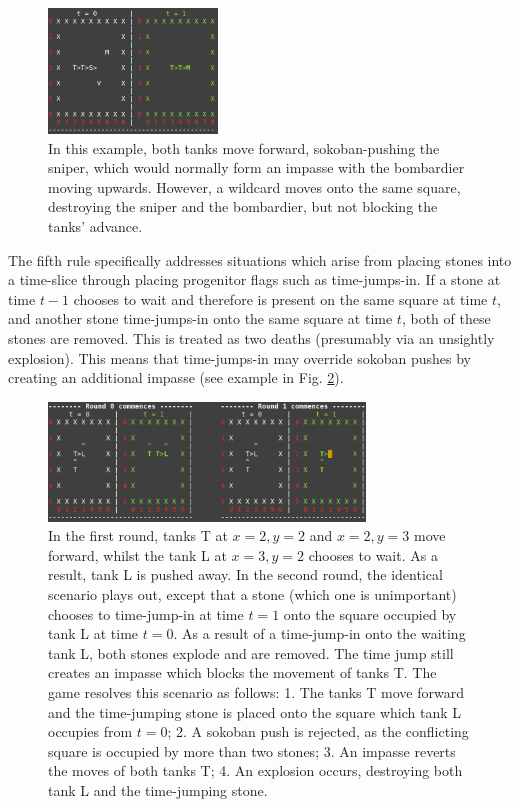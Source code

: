 \documentclass[12pt]{article}
\begin{document}
	\begin{figure}[h]
\begin{center}
   \includegraphics[width=0.4\textwidth]{images/diag_scr_1}
 \caption{In this example, both tanks move forward, sokoban-pushing the sniper, which would normally form an impasse with the bombardier moving upwards. However, a wildcard moves onto the same square, destroying the sniper and the bombardier, but not blocking the tanks' advance.}\label{fig:scr_1}
\end{center}
\end{figure}
	

The fifth rule specifically addresses situations which arise from placing stones into a time-slice through placing progenitor flags such as time-jumps-in. If a stone at time $t-1$ chooses to wait and therefore is present on the same square at time $t$, and another stone time-jumps-in onto the same square at time $t$, both of these stones are removed. This is treated as two deaths (presumably via an unsightly explosion). This means that time-jumps-in may override sokoban pushes by creating an additional impasse (see example in Fig. \ref{fig:scr_2}).

	\begin{figure}[h]
\begin{center}
    \includegraphics[width=0.75\textwidth]{images/diag_scr_2}
 \caption{In the first round, tanks T at $x=2, y=2$ and $x=2, y=3$ move forward, whilst the tank L at $x=3, y=2$ chooses to wait. As a result, tank L is pushed away. In the second round, the identical scenario plays out, except that a stone (which one is unimportant) chooses to time-jump-in at time $t=1$ onto the square occupied by tank L at time $t=0$. As a result of a time-jump-in onto the waiting tank L, both stones explode and are removed. The time jump still creates an impasse which blocks the movement of tanks T. The game resolves this scenario as follows: 1. The tanks T move forward and the time-jumping stone is placed onto the square which tank L occupies from $t = 0$; 2. A sokoban push is rejected, as the conflicting square is occupied by more than two stones; 3. An impasse reverts the moves of both tanks T; 4. An explosion occurs, destroying both tank L and the time-jumping stone.}\label{fig:scr_2}
\end{center}
\end{figure}
	
\end{document}
